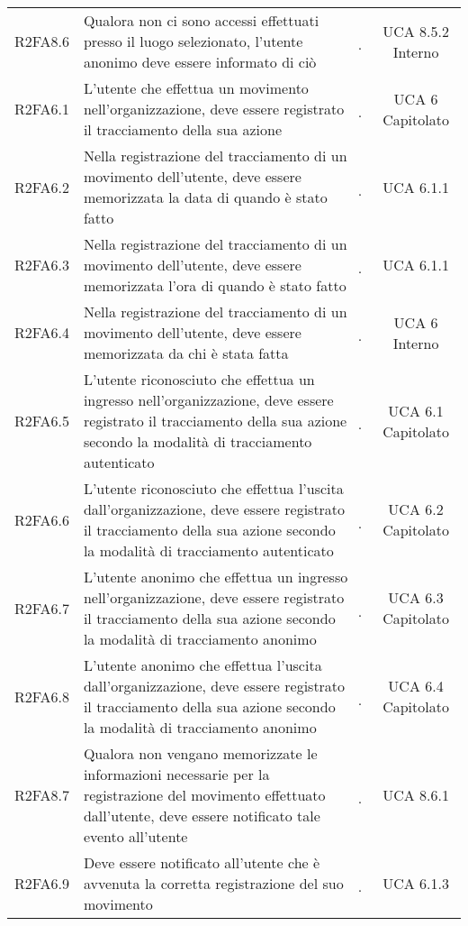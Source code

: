{\begin{longtable}{ c C{8cm} c c}
R2FA8.6 & Qualora non ci sono accessi effettuati presso il luogo selezionato, l'utente anonimo deve essere informato di ciò & \d & UCA 8.5.2 Interno \\

R2FA6.1 & L’utente che effettua un movimento nell’organizzazione, deve essere registrato il tracciamento della sua azione & \d & UCA 6 Capitolato \\

R2FA6.2 & Nella registrazione del tracciamento di un movimento dell’utente, deve essere memorizzata la data di quando è stato fatto & \d & UCA 6.1.1 \\

R2FA6.3 & Nella registrazione del tracciamento di un movimento dell’utente, deve essere memorizzata l’ora di quando è stato fatto & \d & UCA 6.1.1 \\

R2FA6.4 & Nella registrazione del tracciamento di un movimento dell’utente, deve essere memorizzata da chi è stata fatta & \d & UCA 6 Interno \\

R2FA6.5 & L’utente riconosciuto che effettua un ingresso nell’organizzazione, deve essere registrato il tracciamento della sua azione secondo la modalità di tracciamento autenticato & \d & UCA 6.1 Capitolato \\

R2FA6.6 & L’utente riconosciuto che effettua l’uscita dall’organizzazione, deve essere registrato il tracciamento della sua azione secondo la modalità di tracciamento autenticato & \d & UCA 6.2 Capitolato \\

R2FA6.7 & L’utente anonimo che effettua un ingresso nell’organizzazione, deve essere registrato il tracciamento della sua azione secondo la modalità di tracciamento anonimo & \d & UCA 6.3 Capitolato \\

R2FA6.8 & L’utente anonimo che effettua l’uscita dall’organizzazione, deve essere registrato il tracciamento della sua azione secondo la modalità di tracciamento anonimo & \d & UCA 6.4 Capitolato \\

R2FA8.7 & Qualora non vengano memorizzate le informazioni necessarie per la registrazione del movimento effettuato dall’utente, deve essere notificato tale evento all’utente & \d & UCA 8.6.1 \\

R2FA6.9 & Deve essere notificato all’utente che è avvenuta la corretta registrazione del suo movimento & \d & UCA 6.1.3 \\


\end{longtable}}
